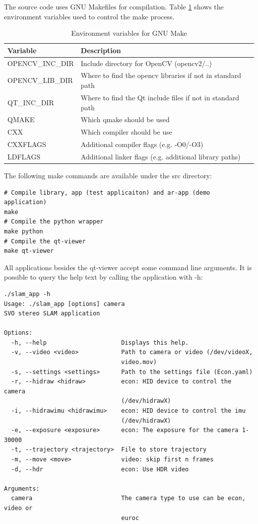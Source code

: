 \documentclass[11pt,a4paper,titlepage,oneside]{report}
\begin{document}
The source code uses GNU Makefiles for compilation. Table \ref{tab:envvars} shows the environment variables used to control the make process.
\begin{table}[H]
  \centering
  \begin{tabular}{|l|l|}
    Variable & Description\\
    \hline
    OPENCV\_INC\_DIR & Include directory for OpenCV (opencv2/..)\\
    OPENCV\_LIB\_DIR & Where to find the opencv libraries if not in standard path\\
    QT\_INC\_DIR & Where to find the Qt include files if not in standard path\\
    QMAKE & Which qmake should be used\\
    CXX & Which compiler should be use\\
    CXXFLAGS & Additional compiler flags (e.g. -O0/-O3)\\
    LDFLAGS & Additional linker flags (e.g.  additional library paths)
  \end{tabular}
\caption{Environment variables for GNU Make}
\label{tab:envvars}
\end{table}

The following make commands are available under the src directory:
\begin{lstlisting}
# Compile library, app (test applicaiton) and ar-app (demo application)
make 
# Compile the python wrapper
make python 
# Compile the qt-viewer
make qt-viewer
\end{lstlisting}

All applications besides the qt-viewer accept some command line arguments. It is possible to query the help text by calling the application with -h:\\
\begin{lstlisting}
./slam_app -h
Usage: ./slam_app [options] camera
SVO stereo SLAM application

Options:
  -h, --help                     Displays this help.
  -v, --video <video>            Path to camera or video (/dev/videoX,
                                 video.mov)
  -s, --settings <settings>      Path to the settings file (Econ.yaml)
  -r, --hidraw <hidraw>          econ: HID device to control the camera
                                 (/dev/hidrawX)
  -i, --hidrawimu <hidrawimu>    econ: HID device to control the imu
                                 (/dev/hidrawX)
  -e, --exposure <exposure>      econ: The exposure for the camera 1-30000
  -t, --trajectory <trajectory>  File to store trajectory
  -m, --move <move>              video: skip first n frames
  -d, --hdr                      econ: Use HDR video

Arguments:
  camera                         The camera type to use can be econ, video or
                                 euroc
\end{lstlisting}
\end{document}
